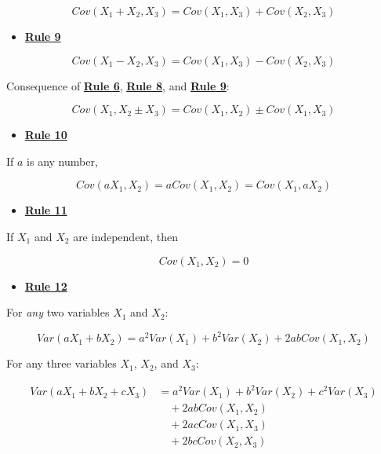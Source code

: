 \documentclass[
]{book}
\providecommand{\tightlist}{%
  \setlength{\itemsep}{0pt}\setlength{\parskip}{0pt}}
\begin{document}
\[
Cov\left(X_{1} + X_{2}, X_{3}\right) = Cov\left(X_{1}, X_{3}\right) + Cov\left(X_{2}, X_{3}\right)  
\]

\begin{itemize}
\tightlist
\item
  \href{./covariance.html\#Rule9}{\textbf{Rule 9}}
\end{itemize}

\[
Cov\left(X_{1} - X_{2}, X_{3}\right) = Cov\left(X_{1}, X_{3}\right) - Cov\left(X_{2}, X_{3}\right)  
\]

Consequence of \href{./covariance.html\#Rule6}{\textbf{Rule 6}}, \href{./covariance.html\#Rule8}{\textbf{Rule 8}}, and \href{./covariance.html\#Rule9}{\textbf{Rule 9}}:

\[
Cov\left(X_{1}, X_{2} \pm X_{3}\right) = Cov\left(X_{1}, X_{2}\right) \pm Cov\left(X_{1}, X_{3}\right)  
\]

\begin{itemize}
\tightlist
\item
  \href{./covariance.html\#Rule10}{\textbf{Rule 10}}
\end{itemize}

If \(a\) is any number,

\[
Cov\left(a X_{1}, X_{2}\right) = a Cov\left(X_{1}, X_{2}\right) =  Cov\left(X_{1}, a X_{2}\right)  
\]

\begin{itemize}
\tightlist
\item
  \href{./covariance.html\#Rule11}{\textbf{Rule 11}}
\end{itemize}

If \(X_{1}\) and \(X_{2}\) are independent, then

\[
Cov\left(X_{1}, X_{2}\right) = 0
\]

\begin{itemize}
\tightlist
\item
  \href{./covariance.html\#Rule12}{\textbf{Rule 12}}
\end{itemize}

For \emph{any} two variables \(X_{1}\) and \(X_{2}\):

\[
Var(aX_{1} + bX_{2}) = 
    a^2Var(X_{1}) + b^2Var(X_{2}) + 2abCov(X_{1}, X_{2})
\]

For any three variables \(X_{1}\), \(X_{2}\), and \(X_{3}\):

\begin{align}
Var(aX_{1} + bX_{2} + cX_{3}) &= 
    a^2Var(X_{1}) + b^2Var(X_{2}) + c^2Var(X_{3}) \\
    & \quad + 2abCov(X_{1}, X_{2}) \\
    & \quad + 2acCov(X_{1}, X_{3}) \\
    & \quad + 2bcCov(X_{2}, X_{3})
\end{align}
\end{document}
